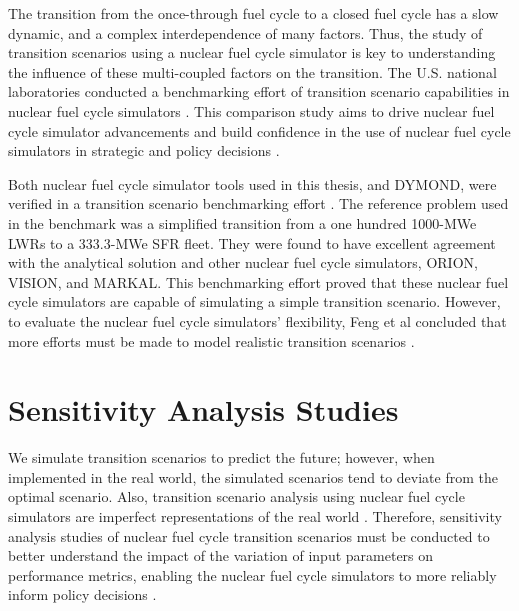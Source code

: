 The transition from the once-through fuel cycle to a closed fuel cycle 
has a slow dynamic, and a complex interdependence of many factors. 
Thus, the study of transition scenarios using a nuclear fuel cycle simulator 
is key to understanding the influence of these multi-coupled factors on the transition. 
The U.S. national laboratories conducted a benchmarking effort
of transition scenario capabilities in nuclear fuel cycle simulators
\cite{feng_standardized_2016,guerin_benchmark_2009}. 
This comparison study aims to drive nuclear fuel cycle simulator advancements and build 
confidence in the use of nuclear fuel cycle simulators in 
strategic and policy decisions \cite{feng_standardized_2016}. 

Both nuclear fuel cycle simulator tools used in this thesis, \Cyclus and DYMOND,
were verified in a transition scenario benchmarking effort
\cite{feng_standardized_2016,bae_standardized_2019}.
The reference problem used in the benchmark was a simplified 
transition from a one hundred 1000-MWe \glspl{LWR} to a 
333.3-MWe \gls{SFR} fleet. 
They were found to have excellent agreement with the 
analytical solution and other nuclear fuel cycle simulators, 
ORION, VISION, and MARKAL.  
This benchmarking effort proved that these nuclear fuel cycle simulators
are capable of simulating a simple transition scenario. 
However, to evaluate the nuclear fuel cycle simulators' flexibility, 
Feng et al concluded that more efforts must be made to model realistic transition scenarios
\cite{feng_standardized_2016}.

\section{Sensitivity Analysis Studies}


We simulate transition scenarios to predict the future; 
however, when implemented in the real world, the simulated 
scenarios tend to deviate from the optimal scenario.
Also, transition scenario analysis using nuclear fuel cycle simulators 
are imperfect representations of the real world \cite{noauthor_effects_2017}.
Therefore, sensitivity analysis studies of nuclear fuel cycle transition 
scenarios must be conducted to better understand the impact of the variation 
of input parameters on performance metrics, enabling the nuclear fuel cycle simulators to
more reliably inform policy decisions \cite{passerini_systematic_2014}. 

